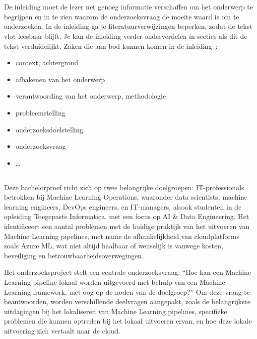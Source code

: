 
\chapter{}%
\label{ch:inleiding}

De inleiding moet de lezer net genoeg informatie verschaffen om het onderwerp te begrijpen en in te zien waarom de onderzoeksvraag de moeite waard is om te onderzoeken. In de inleiding ga je literatuurverwijzingen beperken, zodat de tekst vlot leesbaar blijft. Je kan de inleiding verder onderverdelen in secties als dit de tekst verduidelijkt. Zaken die aan bod kunnen komen in de inleiding~\autocite{Pollefliet2011}:

\begin{itemize}
  \item context, achtergrond
  \item afbakenen van het onderwerp
  \item verantwoording van het onderwerp, methodologie
  \item probleemstelling
  \item onderzoeksdoelstelling
  \item onderzoeksvraag
  \item \ldots
\end{itemize}

\section{}%
\label{sec:probleemstelling}

Deze bachelorproef richt zich op twee belangrijke doelgroepen: IT-professionals betrokken bij Machine Learning Operations, waaronder data scientists, machine learning engineers, DevOps engineers, en IT-managers, alsook studenten in de opleiding Toegepaste Informatica, met een focus op AI & Data Engineering. Het identificeert een aantal problemen met de huidige praktijk van het uitvoeren van Machine Learning pipelines, met name de afhankelijkheid van cloudplatforms zoals Azure ML, wat niet altijd haalbaar of wenselijk is vanwege kosten, beveiliging en betrouwbaarheidsoverwegingen.

Het onderzoeksproject stelt een centrale onderzoeksvraag: ``Hoe kan een Machine Learning pipeline lokaal worden uitgevoerd met behulp van een Machine Learning framework, met oog op de noden van de doelgroep?'' Om deze vraag te beantwoorden, worden verschillende deelvragen aangepakt, zoals de belangrijkste uitdagingen bij het lokaliseren van Machine Learning pipelines, specifieke problemen die kunnen optreden bij het lokaal uitvoeren ervan, en hoe deze lokale uitvoering zich vertaalt naar de cloud.

